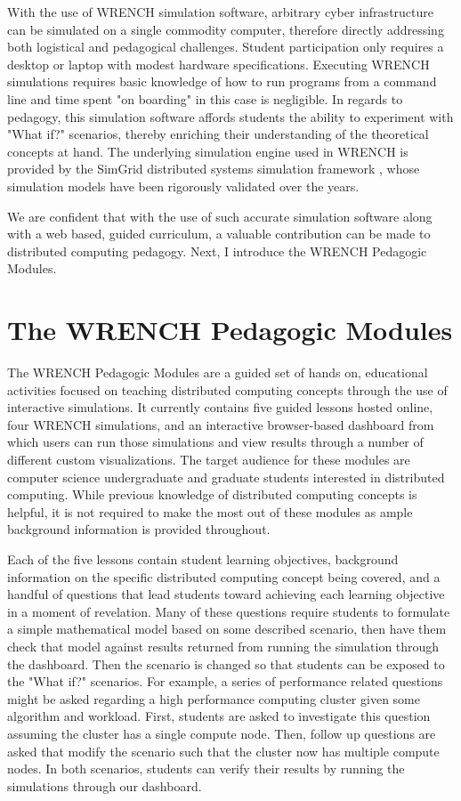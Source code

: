 \documentclass{article} \usepackage{indentfirst}
\begin{document}
With the use of WRENCH simulation software, arbitrary cyber infrastructure can
be simulated on a single commodity computer, therefore directly addressing both
logistical and  pedagogical challenges. Student participation only requires a
desktop or laptop with modest hardware specifications. Executing WRENCH
simulations requires basic knowledge of how to run programs from a command line
and time spent "on boarding" in this case is negligible. In regards to pedagogy,
this simulation software affords students the ability to experiment with "What
if?" scenarios, thereby enriching their understanding of the theoretical
concepts at hand. The underlying simulation engine used in WRENCH is provided by
the SimGrid distributed systems simulation framework \cite{simgrid}, whose
simulation models have been  rigorously validated over the years.

We are confident that with the use of such accurate simulation software along
with a web based, guided curriculum, a valuable contribution can be made to
distributed computing pedagogy. Next, I introduce the WRENCH Pedagogic Modules.

\section{The WRENCH Pedagogic Modules} The WRENCH Pedagogic Modules are a guided
set of hands on, educational activities focused on teaching distributed
computing concepts through the use of interactive simulations. It currently
contains five guided lessons hosted online, four WRENCH simulations, and an
interactive browser-based dashboard from which users can run those simulations
and view results through a number of different custom visualizations. The target
audience for these modules are computer science undergraduate and graduate
students interested in distributed computing. While previous knowledge of
distributed computing concepts is helpful, it is not required to make the most
out of these modules as ample background information is provided throughout.

Each of the five lessons contain student learning objectives, background
information on the specific distributed computing concept being covered, and a
handful of questions that lead students toward achieving each learning objective
in a moment of revelation. Many of these questions require students to formulate
a simple mathematical model based on some described scenario, then have them
check that model against results returned from running the simulation through
the dashboard. Then the scenario is changed so that students can be exposed to
the "What if?" scenarios. For example,  a series of performance related
questions might be asked regarding a high performance computing cluster given
some algorithm and workload. First, students are asked to investigate this
question assuming the cluster has a single compute node. Then, follow up
questions are asked that modify the scenario such that the cluster now has
multiple compute nodes. In both scenarios, students can verify their results by
running the simulations through our dashboard.
\end{document}
